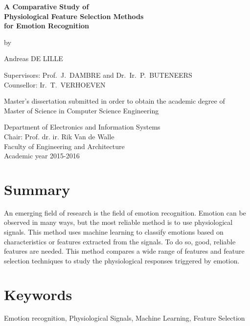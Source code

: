 
\newpage

{
\setlength{\baselineskip}{14pt}
\setlength{\parindent}{0pt}
\setlength{\parskip}{8pt}

\begin{center}

\textbf{\huge
A Comparative Study of \\
Physiological Feature Selection Methods \\
for Emotion Recognition\\
}

by

Andreas DE LILLE

\end{center}

Supervisors: Prof.~J.~DAMBRE and Dr.~Ir.~P.~BUTENEERS \\
Counsellor: Ir.~T.~VERHOEVEN

Master's dissertation submitted in order to obtain the academic degree of\\
Master of Science in Computer Science Engineering

Department of Electronics and Information Systems\\
Chair: Prof. dr. ir. Rik Van de Walle\\
Faculty of Engineering and Architecture\\
Academic year 2015-2016\\



\section*{Summary}

An emerging field of research is the field of emotion recognition. Emotion can be observed in many ways, but the most reliable method is to use physiological signals.  This method uses machine learning to classify emotions based on characteristics or features extracted from the signals. To do so, good, reliable features are needed. This method compares a wide range of features and feature selection techniques to study the physiological responses triggered by emotion.

\section*{Keywords}

Emotion recognition, Physiological Signals, Machine Learning, Feature Selection

}

\newpage %

